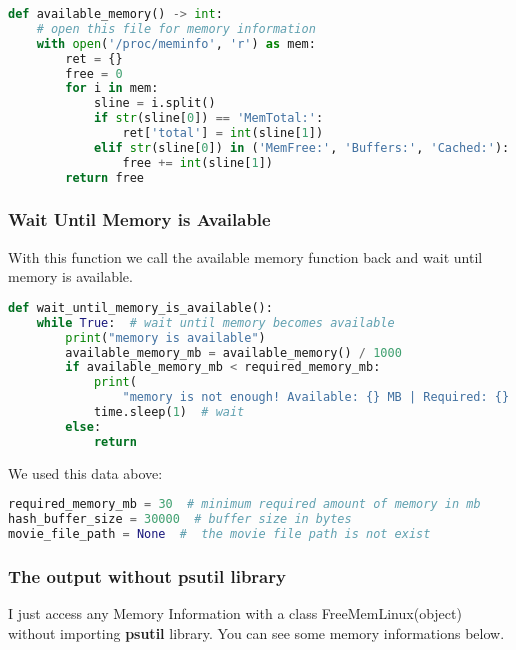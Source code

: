 \documentclass[onecolumn]{article}
\begin{document}
\begin{lstlisting}[language=Python, caption=  Available memory]
def available_memory() -> int:
    # open this file for memory information  
    with open('/proc/meminfo', 'r') as mem:
        ret = {}
        free = 0
        for i in mem:
            sline = i.split()
            if str(sline[0]) == 'MemTotal:':
                ret['total'] = int(sline[1])
            elif str(sline[0]) in ('MemFree:', 'Buffers:', 'Cached:'):
                free += int(sline[1])
        return free

\end{lstlisting}

\subsubsection{Wait Until Memory  is Available}

With this function we call the available memory function back and wait until memory is available. 

\begin{lstlisting}[language=Python, caption=  Waiting Available memory]
def wait_until_memory_is_available():
    while True:  # wait until memory becomes available
        print("memory is available")
        available_memory_mb = available_memory() / 1000
        if available_memory_mb < required_memory_mb:  
            print(
                "memory is not enough! Available: {} MB | Required: {} MB".format(available_memory_mb, required_memory_mb))
            time.sleep(1)  # wait 
        else:
            return  

\end{lstlisting}

We used this data above:\\

\begin{lstlisting}[language=Python, caption=  Data that I should have]
required_memory_mb = 30  # minimum required amount of memory in mb
hash_buffer_size = 30000  # buffer size in bytes 
movie_file_path = None  #  the movie file path is not exist 
\end{lstlisting}

\subsubsection{The output without psutil library}
I just access any Memory Information with a class FreeMemLinux(object) without importing \textbf{psutil} library. You can see some memory informations below.
\end{document}
